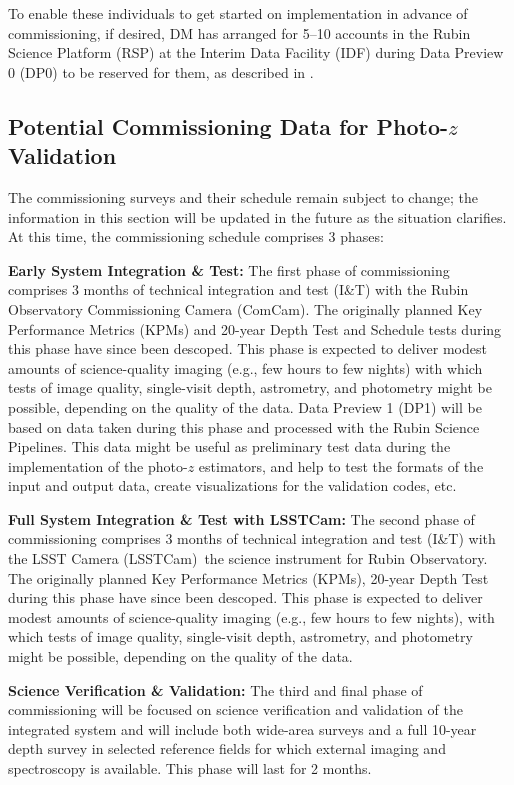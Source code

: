 \documentclass[DM,authoryear,toc]{lsstdoc}
\begin{document}
To enable these individuals to get started on implementation in advance of commissioning, if desired, DM has arranged for 5--10 accounts in the Rubin Science Platform (RSP) at the Interim Data Facility (IDF) during Data Preview 0 (DP0) to be reserved for them, as described in \citep{rtn-004}.


\subsection{Potential Commissioning Data for Photo-$z$ Validation}\label{ssec:pzcoop_commissioning}

The commissioning surveys and their schedule remain subject to change; the information in this section will be updated in the future as the situation clarifies.
At this time, the commissioning schedule comprises 3 phases: 

{\bf Early System Integration \& Test:}
The first phase of commissioning comprises 3 months of technical integration and test (I\&T) with the Rubin Observatory Commissioning Camera (ComCam).
The originally planned Key Performance Metrics (KPMs) and 20-year Depth Test and Schedule tests during this phase have since been descoped. 
This phase is expected to deliver modest amounts of science-quality imaging (e.g., few hours to few nights) with which tests of image quality, single-visit depth, astrometry, and photometry might be possible, depending on the quality of the data.  
Data Preview 1 (DP1) will be based on data taken during this phase and processed with the Rubin Science Pipelines. 
This data might be useful as preliminary test data during the implementation of the photo-$z$ estimators, and help to test the formats of the input and output data, create visualizations for the validation codes, etc.

{\bf Full System Integration \& Test with LSSTCam:}
The second phase of commissioning comprises 3 months of technical integration and test (I\&T) with  the LSST Camera (LSSTCam) \textemdash \,the science instrument for Rubin Observatory. 
The originally planned Key Performance Metrics (KPMs), 20-year Depth Test during this phase have since been descoped. 
This phase is expected to deliver modest amounts of science-quality imaging (e.g., few hours to few nights), with which tests of image quality, single-visit depth, astrometry, and photometry might be possible, depending on the quality of the data. 

{\bf Science Verification \& Validation:}
The third and final phase of commissioning will be focused on science verification and validation of the integrated system and will include both wide-area surveys and a full 10-year depth survey in selected reference fields for which external imaging and spectroscopy is available. 
This phase will last for 2 months. 
\end{document}
